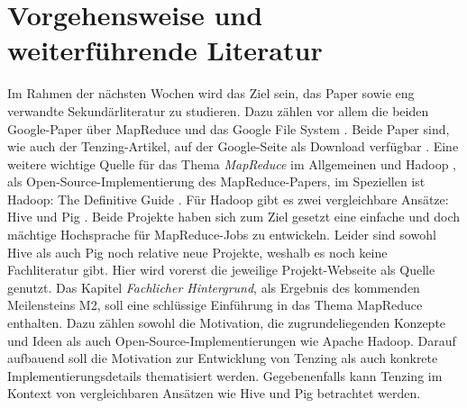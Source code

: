\documentclass[a4paper]{article}
\begin{document}
\section*{Vorgehensweise und weiterführende Literatur}
Im Rahmen der nächsten Wochen wird das Ziel sein, das Paper sowie eng verwandte Sekundärliteratur zu studieren. Dazu zählen vor allem die beiden Google-Paper über MapReduce \cite{MAPREDUCE} und das Google File System \cite{GFS}. Beide Paper sind, wie auch der Tenzing-Artikel, auf der Google-Seite als Download verfügbar \cite{GOOGLE-MAPREDUCE}\cite{GOOGLE-GFS}. Eine weitere wichtige Quelle für das Thema \textit{MapReduce} im Allgemeinen und Hadoop \cite{HADOOP}, als Open-Source-Implementierung des MapReduce-Papers, im Speziellen ist Hadoop: The Definitive Guide \cite{HADOOP-GUIDE}. Für Hadoop gibt es zwei vergleichbare Ansätze: Hive \cite{HIVE} und Pig \cite{PIG}. Beide Projekte haben sich zum Ziel gesetzt eine einfache und doch mächtige Hochsprache für MapReduce-Jobs zu entwickeln. Leider sind sowohl Hive als auch Pig noch relative neue Projekte, weshalb es noch keine Fachliteratur gibt. Hier wird vorerst die jeweilige Projekt-Webseite als Quelle genutzt.
\newline
Das Kapitel \textit{Fachlicher Hintergrund}, als Ergebnis des kommenden Meilensteins M2, soll eine schlüssige Einführung in das Thema MapReduce enthalten. Dazu zählen sowohl die Motivation, die zugrundeliegenden Konzepte und Ideen als auch Open-Source-Implementierungen wie Apache Hadoop. Darauf aufbauend soll die Motivation zur Entwicklung von Tenzing als auch konkrete Implementierungsdetails thematisiert werden. Gegebenenfalls kann Tenzing im Kontext von vergleichbaren Ansätzen wie Hive und Pig betrachtet werden.

\printbibliography
\end{document}
